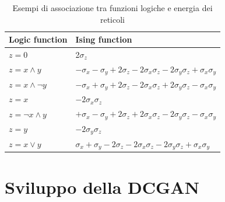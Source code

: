 \documentclass[a4paper]{article}
\begin{document}
\begin{table}[H]
\begin{tabular}{l|l}
Logic function & Ising function\\
\hline
$z = 0$        & 2$\sigma_z$                                                                                   \\
$z = x \wedge y$    & $-\sigma_x - \sigma_y + 2\sigma_z - 2\sigma_x\sigma_z - 2\sigma_y\sigma_z + \sigma_x\sigma_y$ \\
$z = x \wedge \lnot y$   & $-\sigma_x + \sigma_y + 2\sigma_z - 2\sigma_x\sigma_z + 2\sigma_y\sigma_z - \sigma_x\sigma_y$ \\
$z = x$        & $-2\sigma_x\sigma_z$                                                                          \\
$z = \lnot x \wedge y$   & $+\sigma_x - \sigma_y + 2\sigma_z + 2\sigma_x\sigma_z - 2\sigma_y\sigma_z - \sigma_x\sigma_y$ \\
$ z = y$       & $-2\sigma_y\sigma_z$                                                                           \\
$z = x \vee y $   & $\sigma_x + \sigma_y - 2\sigma_z - 2\sigma_x\sigma_z - 2\sigma_y\sigma_z + \sigma_x\sigma_y$  \\

\end{tabular}
\centering
\caption{Esempi di associazione tra funzioni logiche e energia dei reticoli \cite{quantumannealing}}
\end{table}
\section{Sviluppo della DCGAN}
\end{document}
